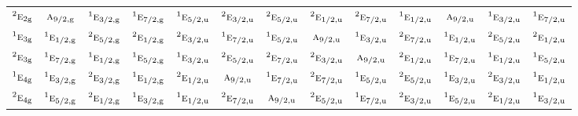 \documentclass[10pt,a4paper]{article}
\numberwithin{equation}{section}
\newcommand{\irr}[1]{\text{\normalfont\scshape #1}}
\newcommand{\conjpair}[1]{{}^{#1}}
\newcommand{\ptag}[1]{\mathrm{#1}}
\begin{document}
{\begin{longtable}{@{}lcccccccccccc@{}}
$\conjpair{2}\irr{e}_{2\ptag{g}}$ & $\irr{a}_{9/2,\ptag{g}}$ & $\conjpair{1}\irr{e}_{3/2,\ptag{g}}$ & $\conjpair{1}\irr{e}_{7/2,\ptag{g}}$ & $\conjpair{1}\irr{e}_{5/2,\ptag{u}}$ & $\conjpair{2}\irr{e}_{3/2,\ptag{u}}$ & $\conjpair{2}\irr{e}_{5/2,\ptag{u}}$ & $\conjpair{2}\irr{e}_{1/2,\ptag{u}}$ & $\conjpair{2}\irr{e}_{7/2,\ptag{u}}$ & $\conjpair{1}\irr{e}_{1/2,\ptag{u}}$ & $\irr{a}_{9/2,\ptag{u}}$ & $\conjpair{1}\irr{e}_{3/2,\ptag{u}}$ & $\conjpair{1}\irr{e}_{7/2,\ptag{u}}$\\
$\conjpair{1}\irr{e}_{3\ptag{g}}$ & $\conjpair{1}\irr{e}_{1/2,\ptag{g}}$ & $\conjpair{2}\irr{e}_{5/2,\ptag{g}}$ & $\conjpair{2}\irr{e}_{1/2,\ptag{g}}$ & $\conjpair{2}\irr{e}_{3/2,\ptag{u}}$ & $\conjpair{1}\irr{e}_{7/2,\ptag{u}}$ & $\conjpair{1}\irr{e}_{5/2,\ptag{u}}$ & $\irr{a}_{9/2,\ptag{u}}$ & $\conjpair{1}\irr{e}_{3/2,\ptag{u}}$ & $\conjpair{2}\irr{e}_{7/2,\ptag{u}}$ & $\conjpair{1}\irr{e}_{1/2,\ptag{u}}$ & $\conjpair{2}\irr{e}_{5/2,\ptag{u}}$ & $\conjpair{2}\irr{e}_{1/2,\ptag{u}}$\\
$\conjpair{2}\irr{e}_{3\ptag{g}}$ & $\conjpair{1}\irr{e}_{7/2,\ptag{g}}$ & $\conjpair{1}\irr{e}_{1/2,\ptag{g}}$ & $\conjpair{1}\irr{e}_{5/2,\ptag{g}}$ & $\conjpair{1}\irr{e}_{3/2,\ptag{u}}$ & $\conjpair{2}\irr{e}_{5/2,\ptag{u}}$ & $\conjpair{2}\irr{e}_{7/2,\ptag{u}}$ & $\conjpair{2}\irr{e}_{3/2,\ptag{u}}$ & $\irr{a}_{9/2,\ptag{u}}$ & $\conjpair{2}\irr{e}_{1/2,\ptag{u}}$ & $\conjpair{1}\irr{e}_{7/2,\ptag{u}}$ & $\conjpair{1}\irr{e}_{1/2,\ptag{u}}$ & $\conjpair{1}\irr{e}_{5/2,\ptag{u}}$\\
$\conjpair{1}\irr{e}_{4\ptag{g}}$ & $\conjpair{1}\irr{e}_{3/2,\ptag{g}}$ & $\conjpair{2}\irr{e}_{3/2,\ptag{g}}$ & $\conjpair{1}\irr{e}_{1/2,\ptag{g}}$ & $\conjpair{2}\irr{e}_{1/2,\ptag{u}}$ & $\irr{a}_{9/2,\ptag{u}}$ & $\conjpair{1}\irr{e}_{7/2,\ptag{u}}$ & $\conjpair{2}\irr{e}_{7/2,\ptag{u}}$ & $\conjpair{1}\irr{e}_{5/2,\ptag{u}}$ & $\conjpair{2}\irr{e}_{5/2,\ptag{u}}$ & $\conjpair{1}\irr{e}_{3/2,\ptag{u}}$ & $\conjpair{2}\irr{e}_{3/2,\ptag{u}}$ & $\conjpair{1}\irr{e}_{1/2,\ptag{u}}$\\
$\conjpair{2}\irr{e}_{4\ptag{g}}$ & $\conjpair{1}\irr{e}_{5/2,\ptag{g}}$ & $\conjpair{2}\irr{e}_{1/2,\ptag{g}}$ & $\conjpair{1}\irr{e}_{3/2,\ptag{g}}$ & $\conjpair{1}\irr{e}_{1/2,\ptag{u}}$ & $\conjpair{2}\irr{e}_{7/2,\ptag{u}}$ & $\irr{a}_{9/2,\ptag{u}}$ & $\conjpair{2}\irr{e}_{5/2,\ptag{u}}$ & $\conjpair{1}\irr{e}_{7/2,\ptag{u}}$ & $\conjpair{2}\irr{e}_{3/2,\ptag{u}}$ & $\conjpair{1}\irr{e}_{5/2,\ptag{u}}$ & $\conjpair{2}\irr{e}_{1/2,\ptag{u}}$ & $\conjpair{1}\irr{e}_{3/2,\ptag{u}}$\\

\end{longtable}}
\end{document}
